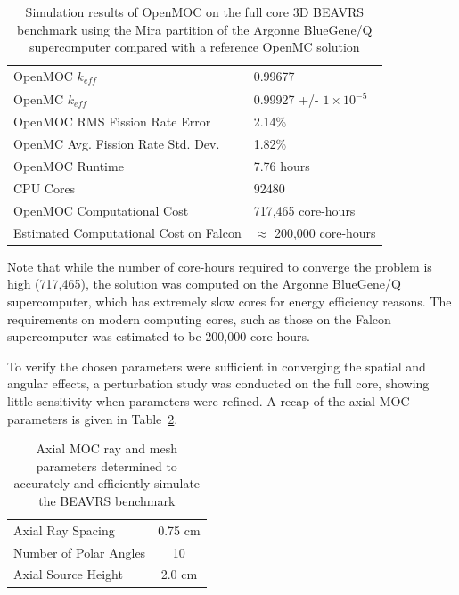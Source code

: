 \begin{table}[ht]
	\centering
	\caption{Simulation results of OpenMOC on the full core 3D BEAVRS benchmark using the Mira partition of the Argonne BlueGene/Q supercomputer compared with a reference OpenMC solution}
	\medskip
	\begin{tabular}{l|l}
		\hline
		OpenMOC $k_{\textit{eff}}$ &  0.99677\\
		OpenMC $k_{\textit{eff}}$ &  0.99927 +/- $1 \times 10^{-5}$\\
		OpenMOC RMS Fission Rate Error & 2.14\%\\
		OpenMC Avg. Fission Rate Std. Dev. & 1.82\% \\
		\hline
		OpenMOC Runtime & 7.76 hours \\
		CPU Cores & 92480 \\
		OpenMOC Computational Cost & 717,465 core-hours \\
		Estimated Computational Cost on Falcon & $\approx$ 200,000 core-hours \\
		\hline
	\end{tabular}
	\label{tab:conc-table}
\end{table}




Note that while the number of core-hours required to converge the problem is high (717,465), the solution was computed on the Argonne BlueGene/Q supercomputer, which has extremely slow cores for energy efficiency reasons. The requirements on modern computing cores, such as those on the Falcon supercomputer was estimated to be 200,000 core-hours.

To verify the chosen parameters were sufficient in converging the spatial and angular effects, a perturbation study was conducted on the full core, showing little sensitivity when parameters were refined. A recap of the axial \ac{MOC} parameters is given in Table~\ref{tab:conc-params}.

\begin{table}[ht]
	\centering
	\caption{Axial MOC ray and mesh parameters determined to accurately and efficiently simulate the BEAVRS benchmark}
	\medskip
	\begin{tabular}{lc}
		\hline
		Axial Ray Spacing & 0.75 cm \\
		Number of Polar Angles & 10 \\
		Axial Source Height & 2.0 cm \\
		\hline
	\end{tabular}
	\label{tab:conc-params}
\end{table}

